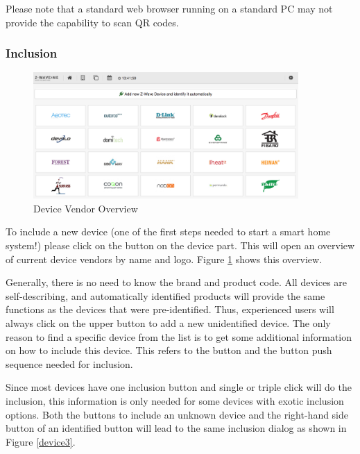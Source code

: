 Please note that a standard
web browser running on a standard PC may not provide the capability to scan QR codes.


\subsubsection{Inclusion}
\label{inclusion}

\begin{figure}
\begin{center}
\includegraphics[width=0.9\textwidth]{pngs/cap4/device1.png}
\caption{\zwave Device Vendor Overview}
\label{device1}
\end{center}
\end{figure}

To include a new \zwave device (one of the first steps needed to start a smart home 
system!) please click on the \keystroke{+} button on the \zwave device part. This will open an 
overview of current \zwave device vendors by name and logo. Figure \ref{device1} 
shows this overview.

Generally, there is no need to know the \zwave brand and product code. All \zwave devices 
are self-describing, and automatically identified products will provide the same functions 
as the devices that were pre-identified. Thus, experienced users will always click on 
the upper button to add a new unidentified \zwave device. The only reason to find a 
specific device from the list is to get some additional information on how to include this 
device. This refers to the button and the button push sequence needed for inclusion.

Since most \zwave devices have one \zwave inclusion button and single or triple click 
will do the inclusion, this information is only needed for some devices with exotic 
inclusion options. Both the buttons to include an unknown device and the right-hand 
side button of an identified button will lead to the same inclusion dialog as 
shown in Figure \ref{device3}.

